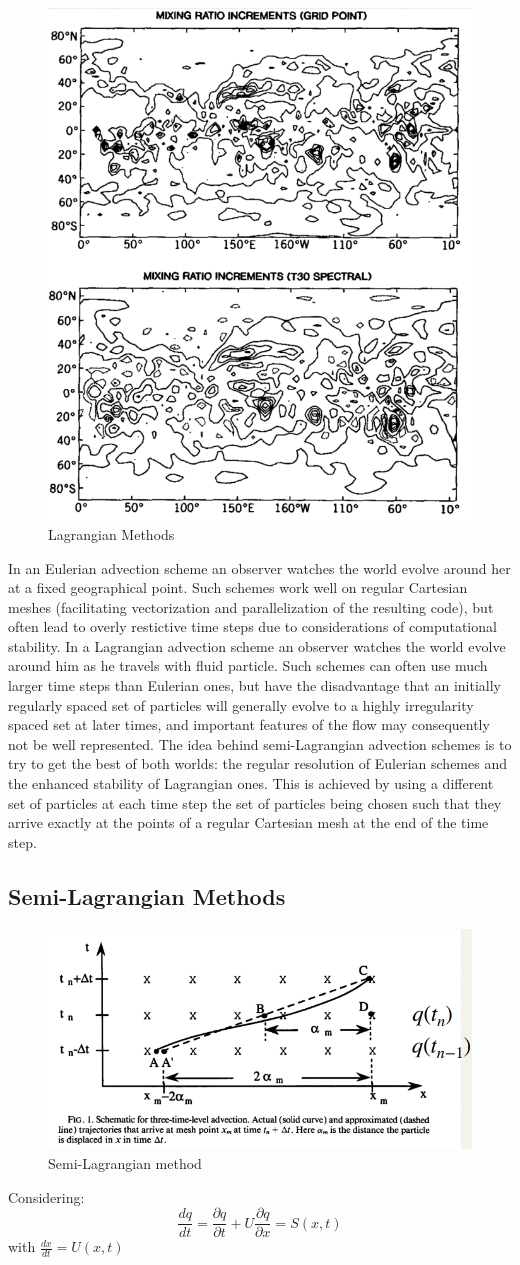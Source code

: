 \begin{figure}[h!]
	\centering
	\includegraphics[width=0.5\linewidth]{uploads/Screenshot 2024-11-19 130213.png}
	\caption{Lagrangian Methods}
	\label{fig:lag method}
\end{figure}
In an Eulerian advection scheme an observer watches the world evolve around her at a fixed geographical point. Such schemes work well on regular Cartesian meshes (facilitating vectorization and parallelization of the resulting code), but often lead to overly restictive time steps due to considerations of computational stability. In a Lagrangian advection scheme an observer watches the world evolve around him as he travels with fluid particle. Such schemes can often use much larger time steps than Eulerian ones, but have the disadvantage that an initially regularly spaced set of particles will generally evolve to a highly irregularity spaced set at later times, and important features of the flow may consequently not be well represented. The idea behind semi-Lagrangian advection schemes is to try to get the best of both worlds: the regular resolution of Eulerian schemes and the enhanced stability of Lagrangian ones. This is achieved by using a different set of particles at each time step the set of particles being chosen such that they arrive exactly at the points of a regular Cartesian mesh at the end of the time step.

\subsection{Semi-Lagrangian Methods}
\begin{figure}[h!]
	\centering
	\includegraphics[width=0.5\linewidth]{uploads/Screenshot 2024-11-19 142400.png}
	\caption{Semi-Lagrangian method}
	\label{fig:enter-label}
\end{figure}
Considering:
$$\frac{dq}{dt}=\frac{\partial q}{\partial t}+U\frac{\partial q}{\partial x}=S(x,t)$$
with $\frac{dx}{dt}=U(x,t)$

